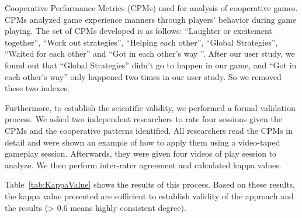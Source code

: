 Cooperative Performance Metrics (CPMs)\cite{CPMs} used for analysis of cooperative games. CPMs analyzed game experience manners through players' behavior during game playing. The set of CPMs developed is as follows: ``Laughter or excitement together'', ``Work out strategies'', ``Helping each other'', ``Global Strategies'', ``Waited for each other'' and ``Got in each other's way ''. 
After our user study, we found out that ``Global Strategies'' didn't go to happen in our game, and ``Got in each other's way'' only happened two times in our user study. So we removed these two indexes.


Furthermore, to establish the scientific validity, we performed a formal validation process. We asked two independent researchers to rate four sessions given the CPMs and the cooperative patterns identified. All researchers read the CPMs in detail and were shown an example of how to apply them using a video-taped gameplay session. Afterwards, they were given four videos of play session to analyze. We then perform inter-rater agreement and calculated kappa values\cite{Kappa1,Kappa2}. 

Table~\ref{tab:KappaValue} shows the results of this process. Based on these results, the kappa value presented are sufficient to establish validity of the approach and the results (> 0.6 means highly consistent degree).

